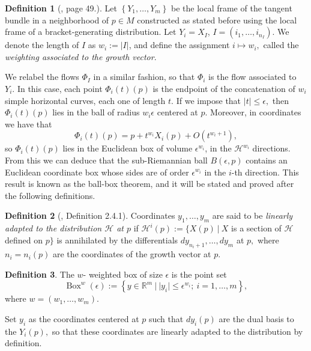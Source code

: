 \documentclass[12pt, letterpaper, reqno]{amsart}
\theoremstyle{definition}
\newtheorem{df}{Definition}
\theoremstyle{plain}
\theoremstyle{remark}
\begin{document}
\begin{df}[\cite{montgomery2002tour}, page 49.] Let $ \left\{ Y_1,\dots, Y_m \right\} $ be the local frame of the tangent bundle in a neighborhood of $ p\in M $ constructed as stated before using the local frame of a bracket-generating distribution. Let $ Y_i=X_I $, $ I=(i_1,\dots,i_{n_I}) $. We denote the length of $ I $ as $ w_i:= \left| I \right| $, and define the assignment $ i\mapsto w_i, $ called the \textit{weighting associated to the growth vector}. 
	
\end{df}

We relabel the flows $ \Phi_I $ in a similar fashion, so that $ \Phi_i $ is the flow associated to $ Y_i. $ In this case, each point $ \Phi_i(t)(p) $ is the endpoint of the concatenation of $ w_i $ simple horizontal curves, each one of length $ t $. If we impose that $ \left| t \right|\leq \epsilon, $ then $ \Phi_i(t)(p) $ lies in the ball of radius $ w_i\epsilon $ centered at $ p. $ Moreover, in coordinates we have that 
$$ \Phi_i(t)(p)=p+t^{w_i}X_i(p)+ O(t^{w_i+1}), $$ 
so $ \Phi_i(t)(p) $ lies in the Euclidean box of volume $ \epsilon^{w_i} $, in the $ \mathcal{H}^{w_i} $ directions. From this we can deduce that the sub-Riemannian ball $ B(\epsilon,p) $ contains an Euclidean coordinate box whose sides are of order $ \epsilon^{w_i} $ in the $ i $-th direction. This result is known as the ball-box theorem, and it will be stated and proved after the following definitions.

\begin{df}[\cite{montgomery2002tour}, Definition 2.4.1] 
	Coordinates $ y_1,\dots,y_m $ are said to be \textit{linearly adapted to the distribution $\mathcal{H}$ at $ p $ } if $ \mathcal{H}^i(p):= \{ X(p) \ | \ X$ is a section of $\mathcal{H}$ defined on $p$$\}$ is annihilated by the differentials $ dy_{n_i+1},\dots, dy_m $ at $ p, $ where $ n_i=n_i(p) $ are the coordinates of the growth vector at $ p. $  
\end{df}
\begin{df}
	The $ w $- weighted box of size $ \epsilon $ is the point set
	$$ \operatorname{Box}^w(\epsilon) := \left\{ y\in \mathbb{R}^m \ | \ |y_i|\leq \epsilon^{w_i}; \ i=1,\dots,m \right\},  $$
	where $ w=(w_1,\dots,w_m). $ 
\end{df}

Set $ y_i $ as the coordinates centered at $ p $ such that $ dy_i(p) $ are the dual basis to the $ Y_i(p), $ so that these coordinates are linearly adapted to the distribution by definition.
\end{document}
